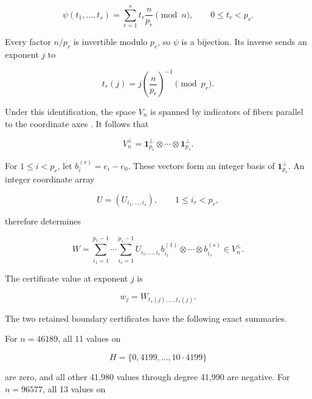 \documentclass[11pt]{article}
\numberwithin{equation}{section}
\begin{document}
\nopagebreak[4]
\[
\psi(t_1,\ldots,t_s)
=\sum_{r=1}^s t_r\frac{n}{p_r}\pmod n,
\qquad
0\leq t_r<p_r.
\tag{3.1}
\]

Every factor $n/p_r$ is invertible modulo $p_r$, so $\psi$ is a bijection. Its
inverse sends an exponent $j$ to

\nopagebreak[4]
\[
t_r(j)=j\left(\frac{n}{p_r}\right)^{-1}\pmod {p_r}.
\tag{3.2}
\]

Under this identification, the space $V_n$ is spanned by indicators of fibers
parallel to the coordinate axes \cite{steinberger2012}. It follows that

\nopagebreak[4]
\[
V_n^\perp
=\mathbf1_{p_1}^{\perp}\otimes\cdots\otimes
  \mathbf1_{p_s}^{\perp}.
\tag{3.3}
\]

For $1\leq i<p_r$, let $b_i^{(r)}=e_i-e_0$. These vectors form an integer
basis of $\mathbf1_{p_r}^{\perp}$. An integer coordinate array

\nopagebreak[4]
\[
U=(U_{i_1,\ldots,i_s}),
\qquad 1\leq i_r<p_r,
\]

therefore determines

\nopagebreak[4]
\[
W=
\sum_{i_1=1}^{p_1-1}\cdots\sum_{i_s=1}^{p_s-1}
U_{i_1,\ldots,i_s}
b_{i_1}^{(1)}\otimes\cdots\otimes b_{i_s}^{(s)}
\in V_n^\perp.
\tag{3.4}
\]

The certificate value at exponent $j$ is

\nopagebreak[4]
\[
w_j=W_{t_1(j),\ldots,t_s(j)}.
\tag{3.5}
\]

The two retained boundary certificates have the following exact summaries.

\begin{center}
\small
{}
\end{center}


For $n=46189$, all 11 values on

\nopagebreak[4]
\[
H=\{0,4199,\ldots,10\cdot4199\}
\]

are zero, and all other 41,980 values through degree 41,990 are negative. For
$n=96577$, all 13 values on
\end{document}
